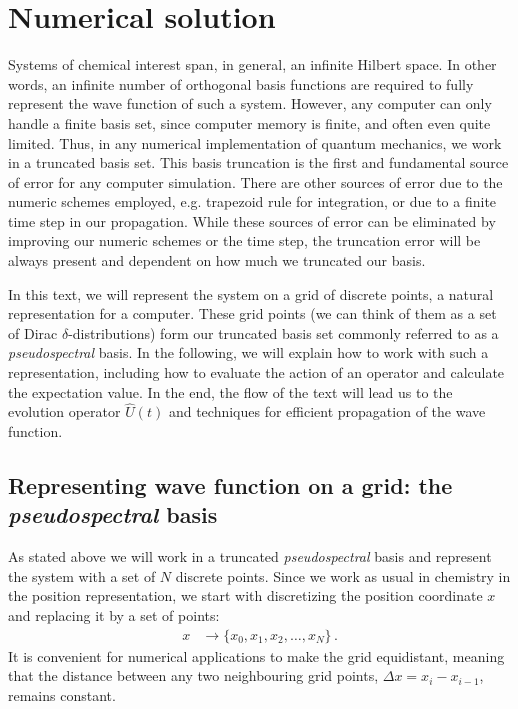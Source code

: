 \section{Numerical solution}

Systems of chemical interest span, in general, an infinite Hilbert space. In other words, an infinite number of orthogonal basis functions are required to fully represent the wave function of such a system. However, any computer can only handle a finite basis set, since computer memory is finite, and often even quite limited. Thus, in any numerical implementation of quantum mechanics, we work in a truncated basis set. This basis truncation is the first and fundamental source of error for any computer simulation. There are other sources of error due to the numeric schemes employed, e.g. trapezoid rule for integration, or due to a finite time step in our propagation. While these sources of error can be eliminated by improving our numeric schemes or the time step, the truncation error will be always present and dependent on how much we truncated our basis.

In this text, we will represent the system on a grid of discrete points, a natural representation for a computer. These grid points (we can think of them as a set of Dirac $\delta$-distributions) form our truncated basis set commonly referred to as a \textit{pseudospectral} basis. 
In the following, we will explain how to work with such a representation, including how to evaluate the action of an operator and calculate the expectation value. In the end, the flow of the text will lead us to the evolution operator $\hat{U}(t)$ and techniques for efficient propagation of the wave function.

\subsection{Representing wave function on a grid: the \textit{pseudospectral} basis}

As stated above we will work in a truncated \textit{pseudospectral} basis and represent the system with a set of $N$ discrete points. Since we work as usual in chemistry in the position representation, we start with discretizing the position coordinate $x$ and replacing it by a set of points:
\begin{align}
    x &\rightarrow \{x_0, x_1, x_2, \dots, x_N\} \, .
\end{align}
It is convenient for numerical applications to make the grid equidistant, meaning that the distance between any two neighbouring grid points, $\Delta x = x_i - x_{i-1}$, remains constant. 

